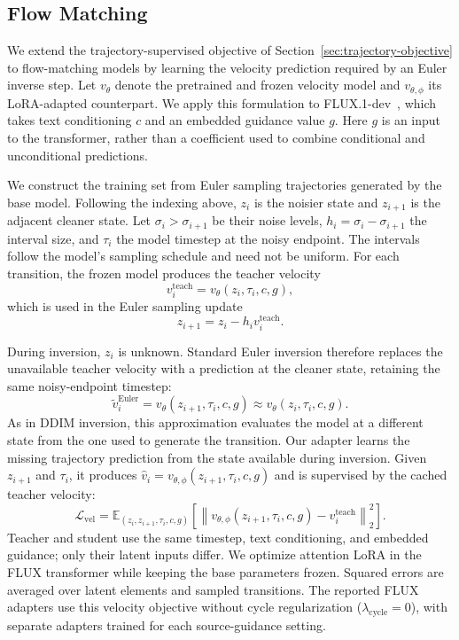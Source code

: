 \documentclass{article} %
\newcommand{\alek}[1]{{\color{purple}{alek: #1}}}
\begin{document}
\subsection{Flow Matching}
\label{sec:flow-objective}

We extend the trajectory-supervised objective of
Section~\ref{sec:trajectory-objective} to flow-matching models by learning
the velocity prediction required by an Euler inverse step. Let $v_\theta$
denote the pretrained and frozen velocity model and $v_{\theta,\phi}$ its
LoRA-adapted counterpart. We apply this formulation to FLUX.1-dev~\citep{flux},
which takes text conditioning $c$ and an embedded guidance value $g$.
\alek{Comment}
Here $g$ is an input to the transformer, rather than a coefficient used to
combine conditional and unconditional predictions.

We construct the training set from Euler sampling trajectories generated by
the base model. Following the indexing above, $z_i$ is the noisier state and
$z_{i+1}$ is the adjacent cleaner state. Let $\sigma_i>\sigma_{i+1}$ be their
noise levels, $h_i=\sigma_i-\sigma_{i+1}$ the interval size, and $\tau_i$ the
model timestep at the noisy endpoint. The intervals follow the model's
sampling schedule and need not be uniform. For each transition, the frozen
model produces the teacher velocity
\[
 v_i^{\mathrm{teach}}=v_\theta(z_i,\tau_i,c,g),
\]
which is used in the Euler sampling update
\begin{equation}
 z_{i+1}=z_i-h_i v_i^{\mathrm{teach}}.
 \label{eq:flow-forward-step}
\end{equation}

During inversion, $z_i$ is unknown. Standard Euler inversion therefore
replaces the unavailable teacher velocity with a prediction at the cleaner
state, retaining the same noisy-endpoint timestep:
\[
 \tilde v_i^{\mathrm{Euler}}=v_\theta(z_{i+1},\tau_i,c,g)
 \approx v_\theta(z_i,\tau_i,c,g).
\]
As in DDIM inversion, this approximation evaluates the model at a different
state from the one used to generate the transition. Our adapter learns the
missing trajectory prediction from the state available during inversion.
Given $z_{i+1}$ and $\tau_i$, it produces
$\hat v_i=v_{\theta,\phi}(z_{i+1},\tau_i,c,g)$ and is supervised by the
cached teacher velocity:
\begin{equation}
 \mathcal{L}_{\mathrm{vel}}
 =\mathbb{E}_{(z_i,z_{i+1},\tau_i,c,g)}\left[
 \left\|v_{\theta,\phi}(z_{i+1},\tau_i,c,g)
       -v_i^{\mathrm{teach}}\right\|_2^2\right].
 \label{eq:flow-objective}
\end{equation}
Teacher and student use the same timestep, text conditioning, and embedded
guidance; only their latent inputs differ. We optimize attention LoRA in
the FLUX transformer while keeping the base parameters frozen. Squared
errors are averaged over latent elements and sampled transitions. The
reported FLUX adapters use this velocity objective without cycle
regularization ($\lambda_{\mathrm{cycle}}=0$), with separate adapters
trained for each source-guidance setting.
\end{document}
